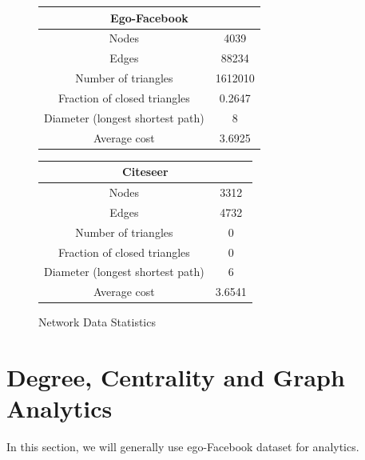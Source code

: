 \documentclass[11pt]{article}
\begin{document}
\begin{figure}[H]
	\centering
	\parbox{.4\linewidth}{
		\centering
		\begin{tabular} {cc}
			\hline\multicolumn{2}{c}{Ego-Facebook}\\
			\hline Nodes & 4039\\
			Edges & 88234\\
			Number of triangles & 1612010 \\
			Fraction of closed triangles & 0.2647\\
			Diameter (longest shortest path) & 8\\
			Average cost & 3.6925\\
		\end{tabular}
	}
\qquad\qquad
	\parbox{.4\linewidth}{
	\centering
	\begin{tabular} {cc}
		\hline\multicolumn{2}{c}{Citeseer}\\
		\hline Nodes & 3312\\
		Edges & 4732\\
		Number of triangles & 0 \\
		Fraction of closed triangles & 0\\
		Diameter (longest shortest path) & 6\\
		Average cost & 3.6541\\
	\end{tabular}
}
\caption{Network Data Statistics}
\end{figure}
\section{Degree, Centrality and Graph Analytics}
In this section, we will generally use ego-Facebook dataset for analytics.
\end{document}
